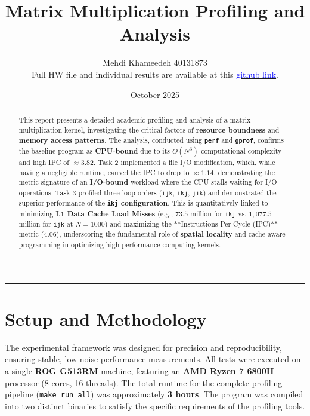 \documentclass[11pt, a4paper]{article}
\title{Matrix Multiplication Profiling and Analysis}
\author{Mehdi Khameedeh 40131873\\Full HW file and individual results are available at this \href{https://github.com/Khameedeh/GPU-programming-Fall2025/tree/main/homeworks/homework-1/problem-2}{\textcolor{blue}{github link}}.
}
\date{October 2025}
\begin{document}
\maketitle
\thispagestyle{empty}

\vspace{0.5cm} %

\begin{abstract}
This report presents a detailed academic profiling and analysis of a matrix multiplication kernel, investigating the critical factors of \textbf{resource boundness} and \textbf{memory access patterns}.
The analysis, conducted using \textbf{\texttt{perf}} and \textbf{\texttt{gprof}}, confirms the baseline program as \textbf{CPU-bound} due to its $O(N^3)$ computational complexity and high IPC of $\approx 3.82$.
Task 2 implemented a file I/O modification, which, while having a negligible runtime, caused the IPC to drop to $\approx 1.14$, demonstrating the metric signature of an \textbf{I/O-bound} workload where the CPU stalls waiting for I/O operations.
Task 3 profiled three loop orders (\texttt{ijk}, \texttt{ikj}, \texttt{jik}) and demonstrated the superior performance of the \textbf{\texttt{ikj} configuration}.
This is quantitatively linked to minimizing \textbf{L1 Data Cache Load Misses} (e.g., $73.5$ million for \texttt{ikj} vs. $1,077.5$ million for \texttt{ijk} at $N=1000$) and maximizing the **Instructions Per Cycle (IPC)** metric ($4.06$), underscoring the fundamental role of \textbf{spatial locality} and cache-aware programming in optimizing high-performance computing kernels.
\end{abstract}

\hrule %
\vspace{0.3cm} %


\section{Setup and Methodology}
The experimental framework was designed for precision and reproducibility, ensuring stable, low-noise performance measurements.
All tests were executed on a single \textbf{ROG G513RM} machine, featuring an \textbf{AMD Ryzen 7 6800H} processor (8 cores, 16 threads).
The total runtime for the complete profiling pipeline (\texttt{make run\_all}) was approximately \textbf{3 hours}.
The program was compiled into two distinct binaries to satisfy the specific requirements of the profiling tools.
\end{document}
